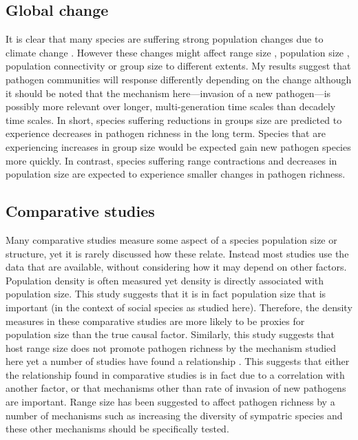 \subsection{Global change}

It is clear that many species are suffering strong population changes due to climate change \cite{thomas2004extinction}.
However these changes might affect range size \cite{thomas2004extinction}, population size \cite{craigie2010large}, population connectivity \cite{wasserman2013population, rivera2015habitat, fonturbel2014forest} or group size \cite{lehmann2010apes, zunino2007habitat, manor2003impact, atwood2006influence} to different extents.
My results suggest that pathogen communities will response differently depending on the change although it should be noted that the mechanism here---invasion of a new pathogen---is possibly more relevant over longer, multi-generation time scales than decadely time scales.
In short, species suffering reductions in groups size \cite{lehmann2010apes, zunino2007habitat, manor2003impact, atwood2006influence} are predicted to experience decreases in pathogen richness in the long term.
Species that are experiencing increases in group size \cite{lehmann2010apes} would be expected gain new pathogen species more quickly.
In contrast, species suffering range contractions \cite{thomas2004extinction} and decreases in population size \cite{craigie2010large} are expected to experience smaller changes in pathogen richness.


\subsection{Comparative studies}

Many comparative studies measure some aspect of a species population size or structure, yet it is rarely discussed how these relate.
Instead most studies use the data that are available, without considering how it may depend on other factors.
Population density is often measured \cite{morand1998density, lindenfors2007parasite, nunn2003comparative, arneberg2002host} yet density is directly associated with population size.
This study suggests that it is in fact population size that is important (in the context of social species as studied here).
Therefore, the density measures in these comparative studies are more likely to be proxies for population size than the true causal factor.
Similarly, this study suggests that host range size does not promote pathogen richness by the mechanism studied here yet a number of studies have found a relationship \cite{kamiya2014determines, nunn2003comparative}.
This suggests that either the relationship found in comparative studies is in fact due to a correlation with another factor, or that mechanisms other than rate of invasion of new pathogens are important.
Range size has been suggested to affect pathogen richness by a number of mechanisms such as increasing the diversity of sympatric species and these other mechanisms should be specifically tested.

